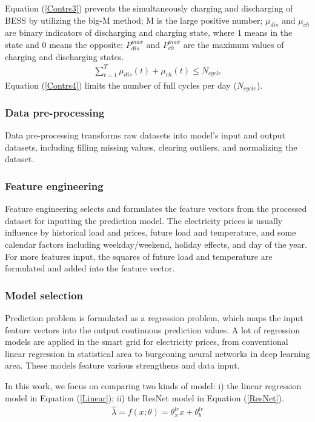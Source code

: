 \documentclass[journal]{IEEEtran}
\begin{document}
Equation (\ref{Contrs3}) prevents the simultaneously charging and discharging of BESS by utilizing the big-M method; M is the large positive number; $\mu_{dis}$ and $\mu_{ch}$ are binary indicators of discharging and charging state, where 1 means in the state and 0 means the opposite; $P_{dis}^{max}$ and $P_{ch}^{max}$ are the maximum values of charging and discharging states.
\begin{equation}
  \label{Contrs4}
  \begin{aligned}
    \sum_{t=1}^T \mu_{dis}(t) + \mu_{ch}(t) \leq N_{cycle}
  \end{aligned}
\end{equation}
Equation (\ref{Contrs4}) limits the number of full cycles per day ($N_{cycle}$).

\subsubsection{Data pre-processing}
Data pre-processing transforms raw datasets into model's input and output datasets, including filling missing values,  clearing outliers, and normalizing the dataset. 

\subsubsection{Feature engineering}
Feature engineering selects and formulates the feature vectors from the processed dataset for inputting the prediction model. The electricity prices is usually influence by historical load and prices, future load and temperature, and some calendar factors including weekday/weekend, holiday effects, and day of the year. For more features input, the squares of future load and temperature are formulated and added into the feature vector.

\subsubsection{Model selection}
Prediction problem is formulated as a regression problem, which maps the input feature vectors into the output continuous prediction values. A lot of regression models are applied in the smart grid for electricity prices, from conventional linear regression in statistical area to burgeoning neural networks in deep learning area. These models feature various strengthens and data input. 

In this work, we focus on comparing two kinds of model: i) the linear regression model in Equation (\ref{Linear}); ii) the ResNet model in Equation (\ref{ResNet}). 
\begin{equation}
  \label{Linear}
  \begin{aligned}
    \hat{\lambda} = f(x; \theta) = \theta_x^{lr} x + \theta_b^{lr} \\ 
  \end{aligned}
\end{equation}
\end{document}

